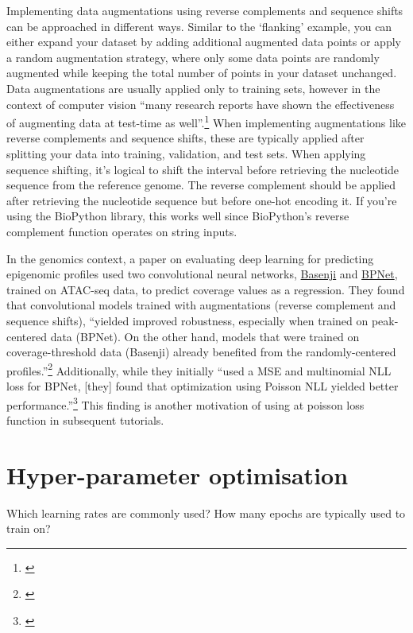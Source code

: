 \documentclass[
]{book}
\begin{document}
Implementing data augmentations using reverse complements and sequence shifts can be approached in different ways. Similar to the `flanking' example, you can either expand your dataset by adding additional augmented data points or apply a random augmentation strategy, where only some data points are randomly augmented while keeping the total number of points in your dataset unchanged. Data augmentations are usually applied only to training sets, however in the context of computer vision ``many research reports have shown the effectiveness of augmenting data at test-time as well''.\footnote{\citet{connor2019}} When implementing augmentations like reverse complements and sequence shifts, these are typically applied after splitting your data into training, validation, and test sets. When applying sequence shifting, it's logical to shift the interval before retrieving the nucleotide sequence from the reference genome. The reverse complement should be applied after retrieving the nucleotide sequence but before one-hot encoding it. If you're using the BioPython library, this works well since BioPython's reverse complement function operates on string inputs.

In the genomics context, a paper on evaluating deep learning for predicting epigenomic profiles used two convolutional neural networks, \href{https://github.com/calico/basenji}{Basenji} and \href{https://github.com/kundajelab/bpnet}{BPNet}, trained on ATAC-seq data, to predict coverage values as a regression. They found that convolutional models trained with augmentations (reverse complement and sequence shifts), ``yielded improved robustness, especially when trained on peak-centered data (BPNet). On the other hand, models that were trained on coverage-threshold data (Basenji) already benefited from the randomly-centered profiles.''\footnote{\citet{toneyan2022}} Additionally, while they initially ``used a MSE and multinomial NLL loss for BPNet, {[}they{]} found that optimization using Poisson NLL yielded better performance.''\footnote{\citet{toneyan2022}} This finding is another motivation of using at poisson loss function in subsequent tutorials.

\section{Hyper-parameter optimisation}\label{hyper-parameter-optimisation}

Which learning rates are commonly used? How many epochs are typically used to train on?
\end{document}

